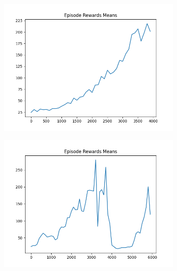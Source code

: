 \begin{figure}[H]
    \centering
    \begin{subfigure}{.47\linewidth}
        \centering
        \includegraphics[width=\textwidth]{pole/2024-06-13_23-08-40_dqn_cartpole_episode_rewards_means.png}
    \end{subfigure}
    \begin{subfigure}{.47\linewidth}
        \centering
        \includegraphics[width=\textwidth]{pole/2024-06-14_19-20-40_dqn_cartpole_episode_rewards_means.png}
    \end{subfigure}
    \begin{subfigure}{.47\linewidth}
        \centering

\end{subfigure}
\end{figure}
